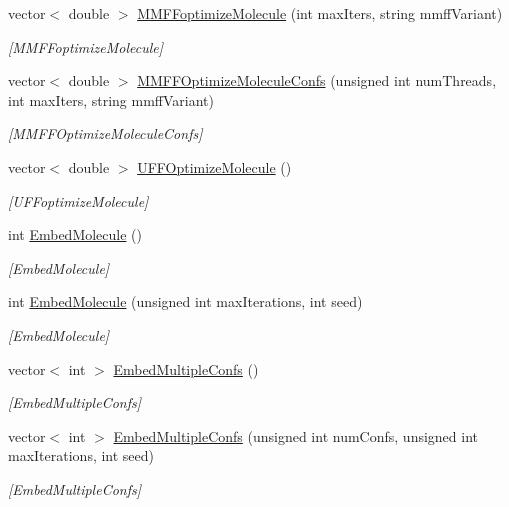 \begin{DoxyCompactItemize}
vector$<$ double $>$ \mbox{\hyperlink{class_molecule_a871ec0fe06c07a873ef29d1af4190640}{M\+M\+F\+Foptimize\+Molecule}} (int max\+Iters, string mmff\+Variant)
\begin{DoxyCompactList}\small\item\em \mbox{[}M\+M\+F\+Foptimize\+Molecule\mbox{]} \end{DoxyCompactList}\item 
vector$<$ double $>$ \mbox{\hyperlink{class_molecule_a839e0ee89e2355a5451cd0f8fdff0a90}{M\+M\+F\+F\+Optimize\+Molecule\+Confs}} (unsigned int num\+Threads, int max\+Iters, string mmff\+Variant)
\begin{DoxyCompactList}\small\item\em \mbox{[}M\+M\+F\+F\+Optimize\+Molecule\+Confs\mbox{]} \end{DoxyCompactList}\item 
vector$<$ double $>$ \mbox{\hyperlink{class_molecule_a5a7fe2f265ee8e8d4aeebfd41bf0ebdc}{U\+F\+F\+Optimize\+Molecule}} ()
\begin{DoxyCompactList}\small\item\em \mbox{[}U\+F\+Foptimize\+Molecule\mbox{]} \end{DoxyCompactList}\item 
int \mbox{\hyperlink{class_molecule_ab5b0afe25fe921c55a3a9ccd3de78b08}{Embed\+Molecule}} ()
\begin{DoxyCompactList}\small\item\em \mbox{[}Embed\+Molecule\mbox{]} \end{DoxyCompactList}\item 
int \mbox{\hyperlink{class_molecule_a49385d99cee0aba8c758a1420ba7c88d}{Embed\+Molecule}} (unsigned int max\+Iterations, int seed)
\begin{DoxyCompactList}\small\item\em \mbox{[}Embed\+Molecule\mbox{]} \end{DoxyCompactList}\item 
vector$<$ int $>$ \mbox{\hyperlink{class_molecule_a05d32198715c54d6db4c139e4c9a3985}{Embed\+Multiple\+Confs}} ()
\begin{DoxyCompactList}\small\item\em \mbox{[}Embed\+Multiple\+Confs\mbox{]} \end{DoxyCompactList}\item 
vector$<$ int $>$ \mbox{\hyperlink{class_molecule_a3364337cff6c6a4d382f8653da23a54f}{Embed\+Multiple\+Confs}} (unsigned int num\+Confs, unsigned int max\+Iterations, int seed)
\begin{DoxyCompactList}\small\item\em \mbox{[}Embed\+Multiple\+Confs\mbox{]} \end{DoxyCompactList}\item 

\end{DoxyCompactItemize}

